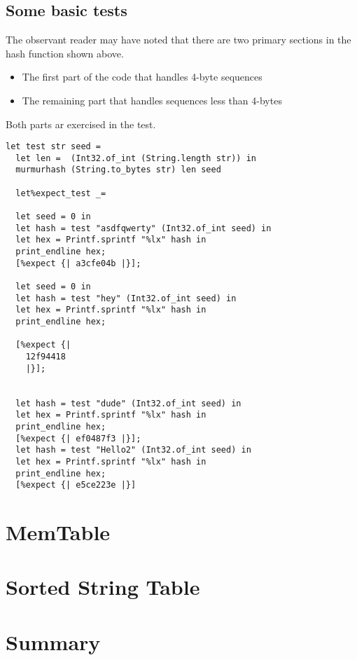 \documentclass[../../../include/open-logic-chapter]{subfiles}
\begin{document}
	\subsection{ Some basic tests}

 The observant reader may have noted that there are two primary
 sections in the hash function shown above.


\begin{itemize}
\item { The first part of the code that handles 4-byte sequences}
\item { The remaining part that handles sequences less than 4-bytes}
\end{itemize}

Both parts ar exercised in the test.


			\begin{lstlisting}[style=ocamlstyle,caption={Tests.}]
 let test str seed =
  let len =  (Int32.of_int (String.length str)) in
  murmurhash (String.to_bytes str) len seed

  let%expect_test _=

  let seed = 0 in
  let hash = test "asdfqwerty" (Int32.of_int seed) in
  let hex = Printf.sprintf "%lx" hash in
  print_endline hex;
  [%expect {| a3cfe04b |}];

  let seed = 0 in
  let hash = test "hey" (Int32.of_int seed) in
  let hex = Printf.sprintf "%lx" hash in
  print_endline hex;

  [%expect {|
    12f94418
    |}];


  let hash = test "dude" (Int32.of_int seed) in
  let hex = Printf.sprintf "%lx" hash in
  print_endline hex;
  [%expect {| ef0487f3 |}];
  let hash = test "Hello2" (Int32.of_int seed) in
  let hex = Printf.sprintf "%lx" hash in
  print_endline hex;
  [%expect {| e5ce223e |}]
	\end{lstlisting}

	\section{ MemTable}
	\section{ Sorted String Table}
	\section{ Summary }

\OLEndChapterHook
\end{document}
